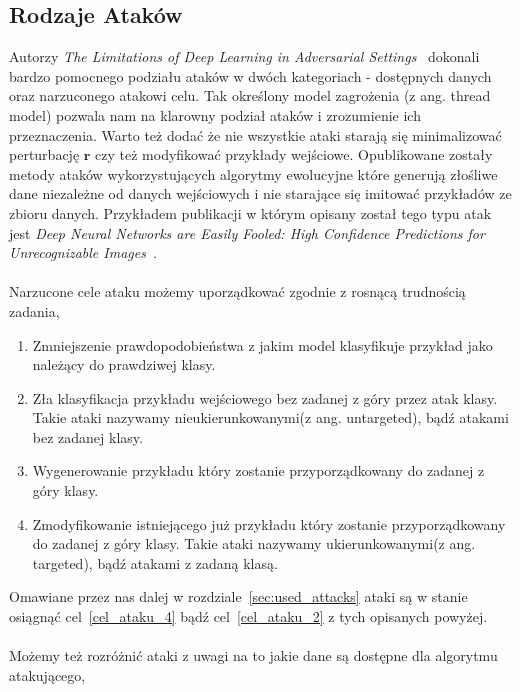 \documentclass[
    left=2.5cm,         %
    right=2.5cm,        %
    top=2.5cm,          %
    bottom=3cm,         %
    bindingoffset=6mm,  %
    nohyphenation=false %
]{eiti/eiti-thesis}
\renewcommand{\vec}[1]{\mathbf{#1}}
\begin{document}
\newpage

\subsection{Rodzaje Ataków}\label{attack-kinds}
Autorzy \textit{The Limitations of Deep Learning in Adversarial Settings}~\cite{DBLP:journals/corr/PapernotMJFCS15}
dokonali bardzo pomocnego podziału ataków w dwóch kategoriach - dostępnych danych oraz narzuconego atakowi celu. Tak określony
model zagrożenia (z ang. thread model) pozwala nam na klarowny podział ataków i zrozumienie ich przeznaczenia. Warto też dodać
że nie wszystkie ataki starają się minimalizować perturbację $\vec{r}$ czy też modyfikować przykłady wejściowe. Opublikowane zostały
metody ataków wykorzystujących algorytmy ewolucyjne które generują złośliwe dane niezależne od danych wejściowych i nie starające się
imitować przykładów ze zbioru danych. Przykładem publikacji w którym opisany został tego typu atak jest \textit{Deep Neural Networks are Easily Fooled: High Confidence Predictions for Unrecognizable Images}~\cite{DBLP:journals/corr/NguyenYC14}.
\\~\\
Narzucone cele ataku możemy uporządkować zgodnie z rosnącą trudnością zadania,
\begin{enumerate}
    \item Zmniejszenie prawdopodobieństwa z jakim model klasyfikuje przykład jako należący do prawdziwej klasy.
    \item \label{cel_ataku_2} Zła klasyfikacja przykładu wejściowego bez zadanej z góry przez atak klasy. Takie ataki nazywamy nieukierunkowanymi(z ang. untargeted), bądź atakami bez zadanej klasy.
    \item Wygenerowanie przykładu który zostanie przyporządkowany do zadanej z góry klasy.
    \item \label{cel_ataku_4} Zmodyfikowanie istniejącego już przykładu który zostanie przyporządkowany do zadanej z góry klasy. Takie ataki nazywamy ukierunkowanymi(z ang. targeted), bądź atakami z zadaną klasą.
\end{enumerate}
Omawiane przez nas dalej w rozdziale~\ref{sec:used_attacks} ataki są w stanie osiągnąć cel~\ref{cel_ataku_4} bądź cel~\ref{cel_ataku_2} z tych opisanych powyżej.
\\~\\
Możemy też rozróżnić ataki z uwagi na to jakie dane są dostępne dla algorytmu atakującego,
\end{document}
